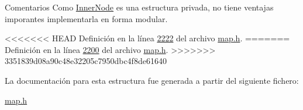\begin{DoxyRemark}{Comentarios}
Como \hyperlink{structaed2_1_1map_1_1InnerNode}{Inner\+Node} es una estructura privada, no tiene ventajas imporantes implementarla en forma modular. 
\end{DoxyRemark}


<<<<<<< HEAD
\-Definición en la línea \hyperlink{map_8h_source_l02222}{2222} del archivo \hyperlink{map_8h_source}{map.\-h}.
=======
Definición en la línea \hyperlink{map_8h_source_l02200}{2200} del archivo \hyperlink{map_8h_source}{map.\+h}.
>>>>>>> 3351839d08a90c48e32205c7950dbc4f8de61640



La documentación para esta estructura fue generada a partir del siguiente fichero\+:\begin{DoxyCompactItemize}
\item 
\hyperlink{map_8h}{map.\+h}\end{DoxyCompactItemize}
